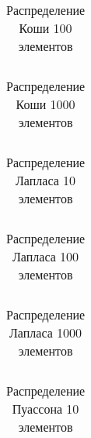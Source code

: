\documentclass[a4paper]{article}
\begin{document}
        \begin{table}[H]
            \centering
            \begin{tabular}{|c|c|c|c|c|c|}
                \hline
                
            \end{tabular}
            \caption{Распределение Коши 100 элементов}
            \label{tab:cauchy_100}
        \end{table}

        \begin{table}[H]
            \centering
            \begin{tabular}{|c|c|c|c|c|c|}
                \hline
                
            \end{tabular}
            \caption{Распределение Коши 1000 элементов}
            \label{tab:cauchy_1000}
        \end{table}

        \begin{table}[H]
            \centering
            \begin{tabular}{|c|c|c|c|c|c|}
                \hline
                
            \end{tabular}
            \caption{Распределение Лапласа 10 элементов}
            \label{tab:laplace_10}
        \end{table}

        \begin{table}[H]
            \centering
            \begin{tabular}{|c|c|c|c|c|c|}
                \hline
                
            \end{tabular}
            \caption{Распределение Лапласа 100 элементов}
            \label{tab:laplace_100}
        \end{table}

        \begin{table}[H]
            \centering
            \begin{tabular}{|c|c|c|c|c|c|}
                \hline
                
            \end{tabular}
            \caption{Распределение Лапласа 1000 элементов}
            \label{tab:laplace_1000}
        \end{table}

        \begin{table}[H]
            \centering
            \begin{tabular}{|c|c|c|c|c|c|}
                \hline
                
            \end{tabular}
            \caption{Распределение Пуассона 10 элементов}
            \label{tab:poisson_10}
        \end{table}
\end{document}
